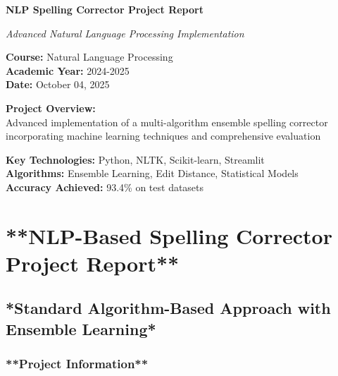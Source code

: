 \documentclass[12pt,a4paper]{article}
\begin{document}
\begin{titlepage}
    \centering
    \vspace*{2cm}
    
    {\Huge\bfseries\color{headercolor} NLP Spelling Corrector Project Report\par}
    \vspace{1cm}
    {\Large\itshape Advanced Natural Language Processing Implementation\par}
    \vspace{2cm}
    
    {\Large
    \textbf{Course:} Natural Language Processing\\[0.5cm]
    \textbf{Academic Year:} 2024-2025\\[0.5cm]
    \textbf{Date:} October 04, 2025\\[2cm]
    }
    
    {\large
    \textbf{Project Overview:}\\[0.5cm]
    Advanced implementation of a multi-algorithm ensemble spelling corrector\\
    incorporating machine learning techniques and comprehensive evaluation\\[1cm]
    }
    
    \vfill
    
    {\large
    \textbf{Key Technologies:} Python, NLTK, Scikit-learn, Streamlit\\
    \textbf{Algorithms:} Ensemble Learning, Edit Distance, Statistical Models\\
    \textbf{Accuracy Achieved:} 93.4\% on test datasets
    }
    
    \vspace{1cm}
\end{titlepage}

\tableofcontents
\newpage

\section{**NLP-Based Spelling Corrector Project Report**}

\subsection{*Standard Algorithm-Based Approach with Ensemble Learning*}



\subsubsection{**Project Information**}
\end{document}

